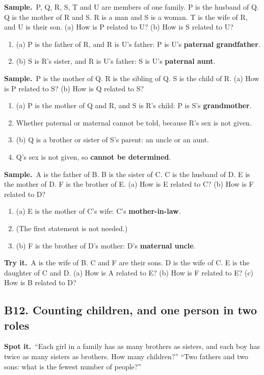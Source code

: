 \documentclass[11pt,a4paper]{article}
\let\oldsubsection\subsection
\renewcommand{\subsection}{\needspace{9\baselineskip}\oldsubsection}
\newcommand{\spot}{\textbf{\color{ember}Spot it.}\ }
\newif\ifkeepsamp
\newcommand{\samp}{\ifkeepsamp\needspace{4\baselineskip}\fi\textbf{\color{ember}Sample.}\ }
\newcommand{\tryit}[1]{\textbf{\color{ember}Try it.}\ #1}
\begin{document}
\samp P, Q, R, S, T and U are members of one family. P is the husband of Q. Q is the mother of R and S. R is a man and S is a woman. T is the wife of R, and U is their son. (a) How is P related to U? (b) How is S related to U?
\begin{enumerate}
\item (a) P is the father of R, and R is U's father: P is U's \textbf{paternal grandfather}.
\item (b) S is R's sister, and R is U's father: S is U's \textbf{paternal aunt}.
\end{enumerate}
\samp P is the mother of Q. R is the sibling of Q. S is the child of R. (a) How is P related to S? (b) How is Q related to S?
\begin{enumerate}
\item (a) P is the mother of Q and R, and S is R's child: P is S's \textbf{grandmother}.
\item Whether paternal or maternal cannot be told, because R's sex is not given.
\item (b) Q is a brother or sister of S's parent: an uncle or an aunt.
\item Q's sex is not given, so \textbf{cannot be determined}.
\end{enumerate}
\samp A is the father of B. B is the sister of C. C is the husband of D. E is the mother of D. F is the brother of E. (a) How is E related to C? (b) How is F related to D?
\begin{enumerate}
\item (a) E is the mother of C's wife: C's \textbf{mother-in-law}.
\item (The first statement is not needed.)
\item (b) F is the brother of D's mother: D's \textbf{maternal uncle}.
\end{enumerate}

\tryit A is the wife of B. C and F are their sons. D is the wife of C. E is the daughter of C and D. (a) How is A related to E? (b) How is F related to E? (c) How is B related to D?

\subsection{B12. Counting children, and one person in two roles}
\spot ``Each girl in a family has as many brothers as sisters, and each boy has twice as many sisters as brothers. How many children?'' ``Two fathers and two sons: what is the fewest number of people?''
\end{document}
